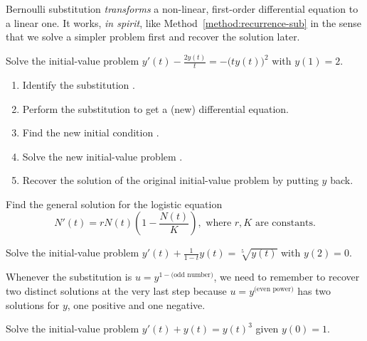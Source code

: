 \documentclass[../main.tex]{subfiles}
\begin{document}
Bernoulli substitution \emph{transforms} a non-linear, first-order differential equation to a linear one. It works, \emph{in spirit}, like Method~\ref{method:recurrence-sub} in the sense that we solve a simpler problem first and recover the solution later.
\begin{example} 
  Solve the initial-value problem \(y'(t) - \frac{2 y(t)}{t}  = -\big( ty(t) \big)^{2}\) with \(y(1) = 2\).

  \begin{enumerate}[wide, label=Step~(\arabic*).]
    \item Identify the substitution \underline{\hspace{2in}}.
    \item Perform the substitution to get a (new) differential equation.
    \item Find the new initial condition \underline{\hspace{3in}}.
    \item Solve the new initial-value problem \underline{\hspace{3in}}.
    \item Recover the solution of the original initial-value problem by putting \(y\) back.
  \end{enumerate}
\end{example}
\clearpage

\begin{example}
  Find the general solution for the logistic equation
  \[
    N'(t) = rN(t) \left( 1 - \frac{N(t)}{K} \right), \text{ where \(r,K\) are constants}.
  \]
\end{example}


\begin{example}
  Solve the initial-value problem \(y'(t) + \frac{1}{1 - t} y(t)  = \sqrt[5]{y(t)}\) with \(y(2) = 0\).
\end{example}
\clearpage

Whenever the substitution is \(u = y^{1-\text{(odd number)}}\), we need to remember to recover two distinct solutions at the very last step because \(u = y^{\text{(even power)}}\) has two solutions for \(y\), one positive and one negative.
\begin{example}
  Solve the initial-value problem \(y'(t) + y(t) = y(t)^{3}\) given \(y(0) = 1\).
\end{example}
\end{document}
